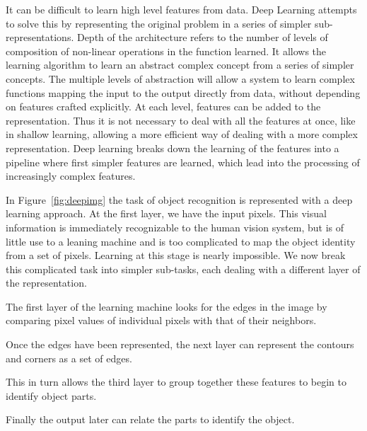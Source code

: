 It can be difficult to learn high level features from data. Deep Learning attempts to solve this by representing the original problem in a series of simpler sub-representations. Depth of the architecture refers to the number of levels of composition of non-linear operations in the function learned. It allows the learning algorithm to learn an abstract complex concept from a series of simpler concepts. The multiple levels of abstraction will allow a system to learn complex functions mapping the input to the output directly from data, without depending on features crafted explicitly. At each level, features can be added to the representation. Thus it is not necessary to deal with all the features at once, like in shallow learning, allowing a more efficient way of dealing with a more complex representation. Deep learning breaks down the learning of the features into a pipeline where first simpler features are learned, which lead into the processing of increasingly complex features. 



In Figure~\ref{fig:deepimg} the task of object recognition is represented with a deep learning approach. At the first layer, we have the input pixels. This visual information is immediately recognizable to the human vision system, but is of little use to a leaning machine and is too complicated to map the object identity from a set of pixels. Learning at this stage is nearly impossible. We now break this complicated task into simpler sub-tasks, each dealing with a different layer of the representation. 
\begin{itemize*}
\item The first layer of the learning machine looks for the edges in the image by comparing pixel values of individual pixels with that of their neighbors. 
\item Once the edges have been represented, the next layer can represent the contours and corners as a set of edges. 
\item This in turn allows the third layer to group together these features to begin to identify object parts. 
\item Finally the output later can relate the parts to identify the object.
\end{itemize*} 



